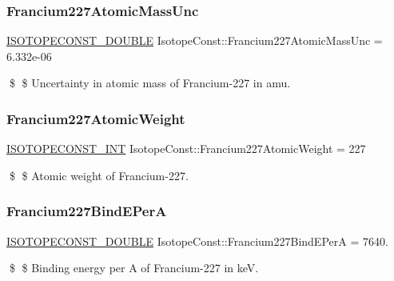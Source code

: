 \subsubsection{\texorpdfstring{Francium227\+Atomic\+Mass\+Unc}{Francium227AtomicMassUnc}}
{\footnotesize\ttfamily \mbox{\hyperlink{group___isotope_const-_macros_ga8f45a7272ce02c0b4c65c44636ed719a}{I\+S\+O\+T\+O\+P\+E\+C\+O\+N\+S\+T\+\_\+\+D\+O\+U\+B\+LE}} Isotope\+Const\+::\+Francium227\+Atomic\+Mass\+Unc = 6.\+332e-\/06}

\$ \$ Uncertainty in atomic mass of Francium-\/227 in amu. \mbox{\label{group___isotope_const-_francium-_fr227_ga2adb7ca9c0fc73fb746bb2f740323f15}} 
\subsubsection{\texorpdfstring{Francium227\+Atomic\+Weight}{Francium227AtomicWeight}}
{\footnotesize\ttfamily \mbox{\hyperlink{group___isotope_const-_macros_ga5f18360b3e99483a35c32d789e62621c}{I\+S\+O\+T\+O\+P\+E\+C\+O\+N\+S\+T\+\_\+\+I\+NT}} Isotope\+Const\+::\+Francium227\+Atomic\+Weight = 227}

\$ \$ Atomic weight of Francium-\/227. \mbox{\label{group___isotope_const-_francium-_fr227_ga62e0c72a04dd89cc035fea24e9155c81}} 
\subsubsection{\texorpdfstring{Francium227\+Bind\+E\+PerA}{Francium227BindEPerA}}
{\footnotesize\ttfamily \mbox{\hyperlink{group___isotope_const-_macros_ga8f45a7272ce02c0b4c65c44636ed719a}{I\+S\+O\+T\+O\+P\+E\+C\+O\+N\+S\+T\+\_\+\+D\+O\+U\+B\+LE}} Isotope\+Const\+::\+Francium227\+Bind\+E\+PerA = 7640.}

\$ \$ Binding energy per A of Francium-\/227 in keV. \mbox{\label{group___isotope_const-_francium-_fr227_ga607faffd76e512894bc264390265cb2e}} 
